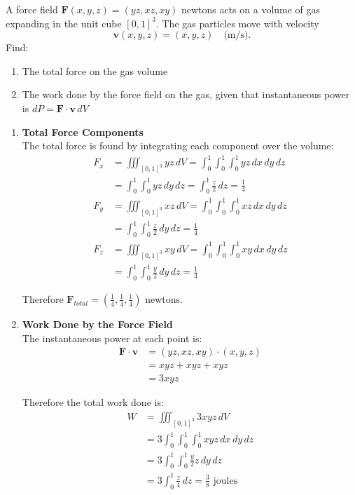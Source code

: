 \exampleline
\begin{example}
A force field $\mathbf{F}(x,y,z) = (yz, xz, xy)$ newtons acts on a volume of gas expanding in the unit cube $[0,1]^3$. The gas particles move with velocity
\[
\mathbf{v}(x,y,z) = (x, y, z) \quad \text{(m/s)}.
\]
Find:
\begin{enumerate}
   \item The total force on the gas volume
   \item The work done by the force field on the gas, given that instantaneous power is $dP = \mathbf{F}\cdot\mathbf{v}\,dV$
\end{enumerate}

\begin{solution}
\begin{enumerate}
   \item \textbf{Total Force Components} \\
   
   The total force is found by integrating each component over the volume:
   \begin{align*}
   F_x &= \iiint_{[0,1]^3} yz\,dV = \int_0^1\int_0^1\int_0^1 yz\,dx\,dy\,dz \\
   &= \int_0^1\int_0^1 yz\,dy\,dz = \int_0^1 \frac{z}{2}\,dz = \frac{1}{4} \\[2ex]
   F_y &= \iiint_{[0,1]^3} xz\,dV = \int_0^1\int_0^1\int_0^1 xz\,dx\,dy\,dz \\
   &= \int_0^1\int_0^1 \frac{z}{2}\,dy\,dz = \frac{1}{4} \\[2ex]
   F_z &= \iiint_{[0,1]^3} xy\,dV = \int_0^1\int_0^1\int_0^1 xy\,dx\,dy\,dz \\
   &= \int_0^1\int_0^1 \frac{y}{2}\,dy\,dz = \frac{1}{4}
   \end{align*}
   
   Therefore $\mathbf{F}_{total} = (\frac{1}{4}, \frac{1}{4}, \frac{1}{4})$ newtons.

   \item \textbf{Work Done by the Force Field} \\
   
   The instantaneous power at each point is:
   \begin{align*}
   \mathbf{F}\cdot\mathbf{v} &= (yz, xz, xy)\cdot(x, y, z) \\
   &= xyz + xyz + xyz \\
   &= 3xyz
   \end{align*}
   
   Therefore the total work done is:
   \begin{align*}
   W &= \iiint_{[0,1]^3} 3xyz\,dV \\
   &= 3\int_0^1\int_0^1\int_0^1 xyz\,dx\,dy\,dz \\
   &= 3\int_0^1\int_0^1 \frac{y}{2}z\,dy\,dz \\
   &= 3\int_0^1 \frac{z}{4}\,dz = \frac{3}{8} \text{ joules}
   \end{align*}
\end{enumerate}
\end{solution}
\end{example}
\exampleline

